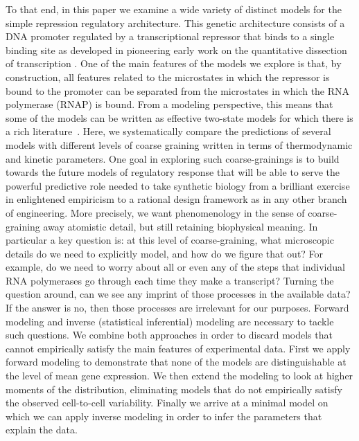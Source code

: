 To that end, in this paper we examine a wide variety of distinct models for the
simple repression regulatory architecture. This genetic architecture consists of
a DNA promoter regulated by a transcriptional repressor that binds to a single
binding site as developed in pioneering early work on the quantitative
dissection of transcription \cite{Oehler1994, Oehler1990}. One of the main
features of the models we explore is that, by construction, all features related
to the microstates in which the repressor is bound to the promoter can be
separated from the microstates in which the RNA polymerase (RNAP) is bound. From
a modeling perspective, this means that some of the models can be written as
effective two-state models for which there is a rich
literature~\cite{Peccoud1995, Shahrezaei2008, Iyer-Biswas2009, Tkacik2009,
Sanchez2013, Jones2014, So2011, Munsky2012}. Here, we systematically compare the
predictions of several models with different levels of coarse graining written
in terms of thermodynamic and kinetic parameters. One goal in exploring such
coarse-grainings is to build towards the future models of regulatory response
that will be able to serve the powerful predictive role needed to take synthetic
biology from a brilliant exercise in enlightened empiricism to a rational design
framework as in any other branch of engineering. More precisely, we want
phenomenology in the sense of coarse-graining away atomistic detail, but still
retaining biophysical meaning. In particular a key question is: at this level of
coarse-graining, what microscopic details do we need to explicitly model, and
how do we figure that out? For example, do we need to worry about all or even
any of the steps that individual RNA polymerases go through each time they make
a transcript? Turning the question around, can we see any imprint of those
processes in the available data? If the answer is no, then those processes are
irrelevant for our purposes. Forward modeling and inverse (statistical
inferential) modeling are necessary to tackle such questions. We combine both
approaches in order to discard models that cannot empirically satisfy the main
features of experimental data. First we apply forward modeling to demonstrate
that none of the models are distinguishable at the level of mean gene
expression. We then extend the modeling to look at higher moments of the
distribution, eliminating models that do not empirically satisfy the observed
cell-to-cell variability. Finally we arrive at a minimal model on which we can
apply inverse modeling in order to infer the parameters that explain the data.

